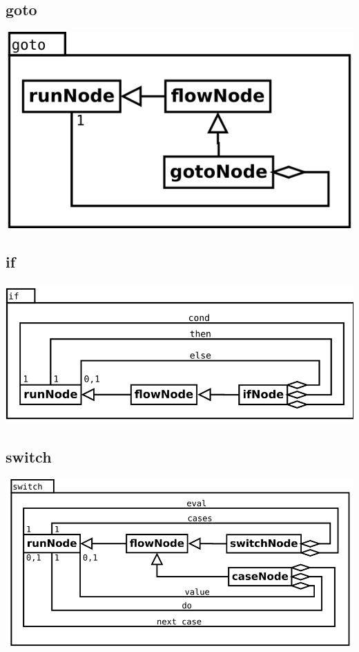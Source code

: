 \subsection{goto}
\begin{center}
\includegraphics[scale=0.4]{goto.png} \\
\end{center}

\subsection{if}
\begin{center}
\includegraphics[scale=0.4]{if.png} \\
\end{center}

\subsection{switch}
\begin{center}
\includegraphics[scale=0.4]{switch.png} \\
\end{center}

